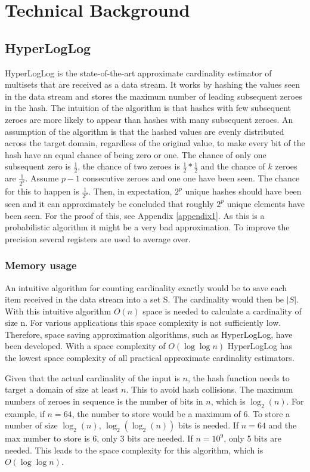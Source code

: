 \chapter{Technical Background}

\section{HyperLogLog}
HyperLogLog is the state-of-the-art approximate cardinality estimator of multisets that are received as a data stream. It works by hashing the values seen in the data stream and stores the maximum number of leading subsequent zeroes in the hash. The intuition of the algorithm is that hashes with few subsequent zeroes are more likely to appear than hashes with many subsequent zeroes. An assumption of the algorithm is that the hashed values are evenly distributed across the target domain, regardless of the original value, to make every bit of the hash have an equal chance of being zero or one. The chance of only one subsequent zero is $\frac{1}{2}$, the chance of two zeroes is $\frac{1}{2}*\frac{1}{2}$ and the chance of $k$ zeroes are $\frac {1} {2^k}$. Assume $p-1$ consecutive zeroes and one one have been seen. The chance for this to happen is $\frac{1}{2^p}$. Then, in expectation, $2^p$ unique hashes should have been seen and it can approximately be concluded that roughly $2^p$ unique elements have been seen. For the proof of this, see Appendix \ref{appendix1}. As this is a probabilistic algorithm it might be a very bad approximation. To improve the precision several registers are used to average over. \cite{hyperloglog}

\subsection{Memory usage}
An intuitive algorithm for counting cardinality exactly would be to save each item received in the data stream into a set S. The cardinality would then be $|S|$. With this intuitive algorithm $O(n)$ space is needed to calculate a cardinality of size n. For various applications this space complexity is not sufficiently low. Therefore, space saving approximation algorithms, such as HyperLogLog, have been developed. With a space complexity of $O(\log\log n)$ HyperLogLog has the lowest space complexity of all practical approximate cardinality estimators. 

Given that the actual cardinality of the input is $n$, the hash function needs to target a domain of size at least $n$. This to avoid hash collisions. The maximum numbers of zeroes in sequence is the number of bits in $n$, which is $\log_2(n)$. For example, if $n=64$, the number to store would be a maximum of 6. To store a number of size $\log_2(n)$, $\log_2(\log_2(n))$ bits is needed. If $n=64$ and the max number to store is 6, only 3 bits are needed. If $n=10^9$, only 5 bits are needed. This leads to the space complexity for this algorithm, which is $O(\log\log n)$. \cite{hyperloglog}

